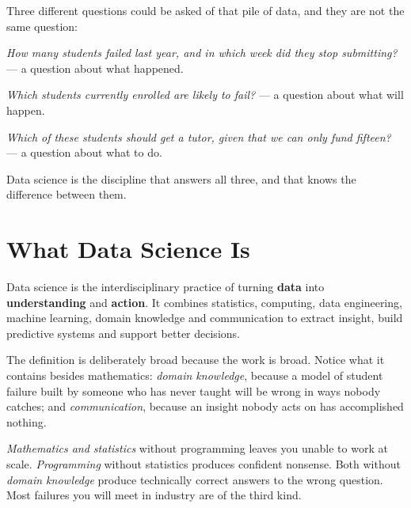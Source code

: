 Three different questions could be asked of that pile of data, and they are not
the same question:

\begin{tight}
  \item \emph{How many students failed last year, and in which week did they stop submitting?} --- a question about what happened.
  \item \emph{Which students currently enrolled are likely to fail?} --- a question about what will happen.
  \item \emph{Which of these students should get a tutor, given that we can only fund fifteen?} --- a question about what to do.
\end{tight}

Data science is the discipline that answers all three, and that knows the
difference between them.

\section{What Data Science Is}

\begin{definitionbox}
Data science is the interdisciplinary practice of turning \textbf{data} into
\textbf{understanding} and \textbf{action}. It combines statistics, computing,
data engineering, machine learning, domain knowledge and communication to
extract insight, build predictive systems and support better decisions.
\end{definitionbox}

The definition is deliberately broad because the work is broad. Notice what it
contains besides mathematics: \emph{domain knowledge}, because a model of student
failure built by someone who has never taught will be wrong in ways nobody
catches; and \emph{communication}, because an insight nobody acts on has
accomplished nothing.

\begin{conceptbox}
\emph{Mathematics and statistics} without programming leaves you unable to work
at scale. \emph{Programming} without statistics produces confident nonsense.
Both without \emph{domain knowledge} produce technically correct answers to the
wrong question. Most failures you will meet in industry are of the third kind.
\end{conceptbox}

